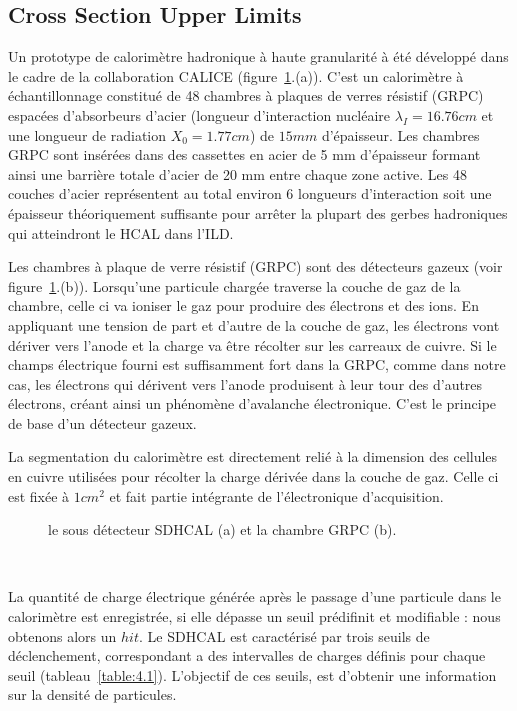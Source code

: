 \subsection{Cross Section Upper Limits}

Un prototype de calorim\`etre hadronique \`a haute granularit\'e \`a \'et\'e d\'evelopp\'e dans le cadre de la collaboration CALICE (figure~\ref{figure:4.4}.(a)). C'est un calorim\`etre \`a \'echantillonnage constitu\'e de 48 chambres \`a plaques de verres r\'esistif (GRPC) espac\'ees d'absorbeurs d'acier (longueur d'interaction nucl\'eaire
 ${\lambda}_{I} = 16.76 cm$ et une longueur de radiation $X_{0} = 1.77 cm$) de $15 mm$ d'\'epaisseur. Les chambres GRPC sont ins\'er\'ees dans des cassettes en acier de 5 mm d'\'epaisseur formant ainsi une barri\`ere totale d'acier de 20 mm entre chaque zone active. Les 48 couches d'acier repr\'esentent au total environ 6 longueurs d'interaction soit une \'epaisseur th\'eoriquement suffisante pour arr\^eter la plupart des gerbes hadroniques qui atteindront le HCAL dans l'ILD.
~\par Les chambres \`a plaque de verre r\'esistif (GRPC) sont des d\'etecteurs gazeux (voir figure~\ref{figure:4.4}.(b)). Lorsqu'une particule charg\'ee traverse la couche de gaz de la chambre, celle ci va ioniser le gaz pour produire des \'electrons et des ions. En appliquant une tension de part et d'autre de la couche de gaz, les \'electrons vont d\'eriver vers l'anode et la charge va \^etre r\'ecolter sur les carreaux de cuivre. Si le champs \'electrique fourni est suffisamment fort dans la GRPC, comme dans notre cas, les \'electrons qui d\'erivent vers l'anode produisent \`a leur tour des d'autres \'electrons, cr\'eant ainsi un ph\'enom\`ene d'avalanche \'electronique. C'est le principe de base d'un d\'etecteur gazeux.
~\par La segmentation du calorim\`etre est directement reli\'e \`a la dimension des cellules en cuivre utilis\'ees pour r\'ecolter la charge d\'eriv\'ee dans la couche de gaz. Celle ci est fix\'ee \`a $1 cm^2$ et fait partie int\'egrante de l'\'electronique d'acquisition.

\begin{figure}[H]
  \centering
  \quad
  \caption{le sous d\'etecteur SDHCAL (a) et la chambre GRPC (b).}
  \label{figure:4.4}
\end{figure}

~\par La quantit\'e de charge \'electrique g\'en\'er\'ee apr\`es le passage d'une particule dans le calorim\`etre est enregistr\'ee, si elle dépasse un seuil prédifinit et modifiable : nous obtenons alors un $hit$. Le SDHCAL est caract\'eris\'e par trois seuils de d\'eclenchement, correspondant a des intervalles de charges d\'efinis pour chaque seuil (tableau~\ref{table:4.1}). L'objectif de ces seuils, est d'obtenir une information sur la densité de particules. 

